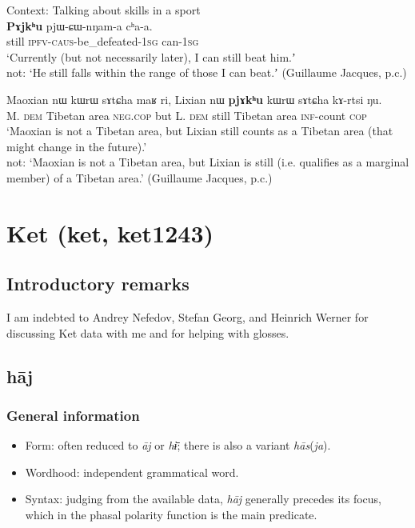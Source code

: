 \begin{exe}
	\ex Context: Talking about skills in a sport\label{exAppendixJaphugMarginal1}\\
	\gll \textbf{Pɤjkʰu} pjɯ-ɕɯ-nŋam-a cʰa-a.\\
	still \textsc{ipfv}-\textsc{caus}-be\_defeated-1\textsc{sg} can-1\textsc{sg}\\
	\glt \lq Currently (but not necessarily later), I can still beat him.ʼ\\
	not: \lq He still falls within the range of those I can beat.ʼ (Guillaume Jacques, p.c.)
	
	\ex\label{exAppendixJaphugMarginal2}
	\gll Maoxian nɯ kɯrɯ sɤtɕha maʁ ri, Lixian nɯ \textbf{pjɤkʰu} kɯrɯ sɤtɕha kɤ-rtsi ŋu.\\
	M. \textsc{dem} Tibetan area \textsc{neg}.\textsc{cop} but L. \textsc{dem} still Tibetan area \textsc{inf}-count \textsc{cop}\\
	\glt \lq Maoxian is not a Tibetan area, but Lixian still counts as a Tibetan area (that might change in the future).'\\
	not: \lq Maoxian is not a Tibetan area, but Lixian is still (i.e. qualifies as a marginal member) of a Tibetan area.' (Guillaume Jacques, p.c.)
\end{exe}

\section{Ket (ket, ket1243)}
\label{appendixKet}
\subsection{Introductory remarks}
I am indebted to Andrey Nefedov, Stefan Georg, and Heinrich Werner for discussing Ket data with me and for helping with glosses.

\subsection{hāj}
\subsubsection{General information}
\begin{itemize}
	\item Form: often reduced to \textit{āj} or \textit{hɨ̄}; there is also a variant \mbox{\textit{hās}(\textit{ja})}.
	\item Wordhood: independent grammatical word.
	\item Syntax: judging from the available data, \textit{hāj} generally precedes its focus, which in the phasal polarity function is the main predicate.
\end{itemize}


